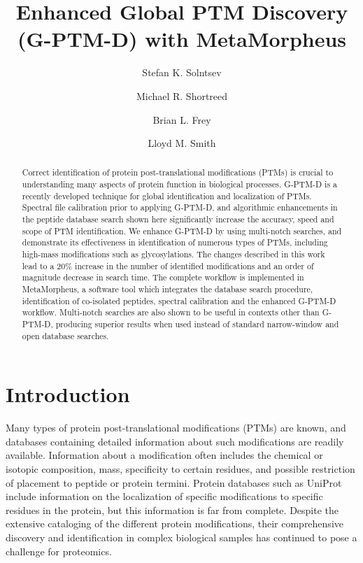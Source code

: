\documentclass[journal=jprobs,manuscript=article]{achemso}
\author{Stefan K. Solntsev}
\author{Michael R. Shortreed}
\author{Brian L. Frey}
\author{Lloyd M. Smith}
\affiliation[UwMadison]
{University of Wisconsin-Madison}
\title[Enhanced Global PTM Discovery (G-PTM-D) with MetaMorpheus]
  {Enhanced Global PTM Discovery (G-PTM-D) with MetaMorpheus}
\begin{document}
	

\sloppy

\begin{abstract}

Correct identification of protein post-translational modifications (PTMs) is crucial to understanding many aspects of protein function in biological processes.
G-PTM-D is a recently developed technique for global identification and localization of PTMs.
Spectral file calibration prior to applying G-PTM-D, and algorithmic enhancements in the peptide database search shown here significantly increase the accuracy, speed and scope of PTM identification.
We enhance G-PTM-D by using multi-notch searches, and demonstrate its effectiveness in identification of numerous types of PTMs, including high-mass modifications such as glycosylations.
The changes described in this work lead to a 20\% increase in the number of identified modifications and an order of magnitude decrease in search time.
The complete workflow is implemented in MetaMorpheus, a software tool which integrates the database search procedure, identification of co-isolated peptides, spectral calibration and the enhanced G-PTM-D workflow.
Multi-notch searches are also shown to be useful in contexts other than G-PTM-D, producing superior results when used instead of standard narrow-window and open database searches.
\end{abstract}

\section{Introduction}

Many types of protein post-translational modifications (PTMs) are known, and databases containing detailed information about such modifications are readily available\citep{Creasy_2004}.
Information about a modification often includes the chemical or isotopic composition, mass, specificity to certain residues, and possible restriction of placement to peptide or protein termini.
Protein databases such as UniProt\citep{Uniprot_2017} include information on the localization of specific modifications to specific residues in the protein, but this information is far from complete.
Despite the extensive cataloging of the different protein modifications, their comprehensive discovery and identification in complex biological samples has continued to pose a challenge for proteomics\citep{Olsen_2013}.
\end{document}
